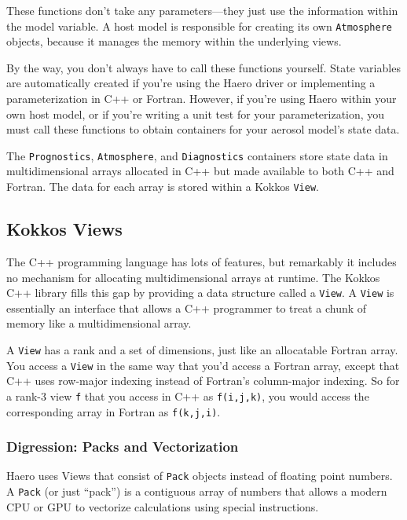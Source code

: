 These functions don't take any parameters---they just use the information within
the model variable. A host model is responsible for creating its own
\texttt{Atmosphere} objects, because it manages the memory within the underlying
views.

By the way, you don't always have to call these functions yourself. State
variables are automatically created if you're using the Haero driver or
implementing a parameterization in C++ or Fortran. However, if you're using
Haero within your own host model, or if you're writing a unit test for your
parameterization, you must call these functions to obtain containers for your
aerosol model's state data.

The \texttt{Prognostics}, \texttt{Atmosphere}, and \texttt{Diagnostics} containers
store state data in multidimensional arrays allocated in C++ but made available
to both C++ and Fortran. The data for each array is stored within a Kokkos
\texttt{View}.

\subsection*{Kokkos Views}

The C++ programming language has lots of features, but remarkably it includes no
mechanism for allocating multidimensional arrays at runtime. The Kokkos C++
library fills this gap by providing a data structure called a \texttt{View}. A
\texttt{View} is essentially an interface that allows a C++ programmer to treat a
chunk of memory like a multidimensional array.

A \texttt{View} has a rank and a set of dimensions, just like an allocatable
Fortran array. You access a \texttt{View} in the same way that you'd access a
Fortran array, except that C++ uses row-major indexing instead of Fortran's
column-major indexing. So for a rank-3 view \texttt{f} that you access in C++
as \texttt{f(i,j,k)}, you would access the corresponding array in Fortran as
\texttt{f(k,j,i)}.

\subsubsection*{Digression: Packs and Vectorization}

Haero uses Views that consist of \texttt{Pack} objects instead of floating
point numbers. A \texttt{Pack} (or just ``pack'') is a contiguous array of numbers
that allows a modern CPU or GPU to vectorize calculations using special
instructions.

